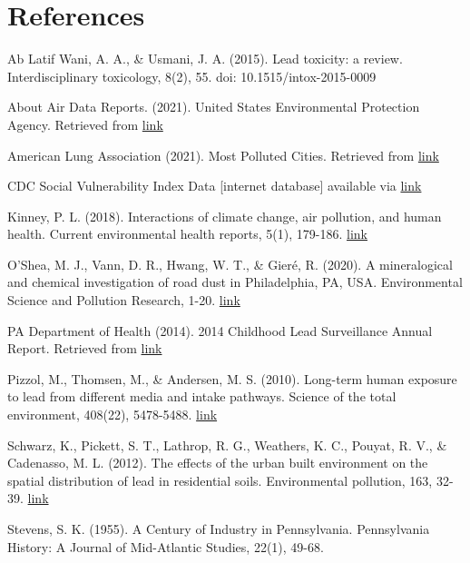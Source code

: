 \documentclass[
  12pt,
]{article}
\begin{document}
\hypertarget{references}{%
\section{References}\label{references}}

Ab Latif Wani, A. A., \& Usmani, J. A. (2015). Lead toxicity: a review.
Interdisciplinary toxicology, 8(2), 55. doi: 10.1515/intox-2015-0009

About Air Data Reports. (2021). United States Environmental Protection
Agency. Retrieved from
\href{https://www.epa.gov/outdoor-air-quality-data/about-air-data-reports}{link}

American Lung Association (2021). Most Polluted Cities. Retrieved from
\href{https://www.lung.org/research/sota/city-rankings/most-polluted-cities}{link}

CDC Social Vulnerability Index Data {[}internet database{]} available
via
\href{https://www.atsdr.cdc.gov/placeandhealth/svi/data_documentation_download.html}{link}

Kinney, P. L. (2018). Interactions of climate change, air pollution, and
human health. Current environmental health reports, 5(1), 179-186.
\href{https://doi.org/10.1007/s40572-018-0188-x}{link}

O'Shea, M. J., Vann, D. R., Hwang, W. T., \& Gieré, R. (2020). A
mineralogical and chemical investigation of road dust in Philadelphia,
PA, USA. Environmental Science and Pollution Research, 1-20.
\href{https://doi.org/10.1007/s11356-019-06746-y}{link}

PA Department of Health (2014). 2014 Childhood Lead Surveillance Annual
Report. Retrieved from
\href{https://www.health.pa.gov/topics/Documents/Environmental\%20Health/2014\%20Lead\%20Surveillance\%20Annual\%20Report.pdf}{link}

Pizzol, M., Thomsen, M., \& Andersen, M. S. (2010). Long-term human
exposure to lead from different media and intake pathways. Science of
the total environment, 408(22), 5478-5488.
\href{https://doi.org/10.1016/j.scitotenv.2010.07.077}{link}

Schwarz, K., Pickett, S. T., Lathrop, R. G., Weathers, K. C., Pouyat, R.
V., \& Cadenasso, M. L. (2012). The effects of the urban built
environment on the spatial distribution of lead in residential soils.
Environmental pollution, 163, 32-39.
\href{https://doi.org/10.1016/j.envpol.2011.12.003}{link}

Stevens, S. K. (1955). A Century of Industry in Pennsylvania.
Pennsylvania History: A Journal of Mid-Atlantic Studies, 22(1), 49-68.
\end{document}
